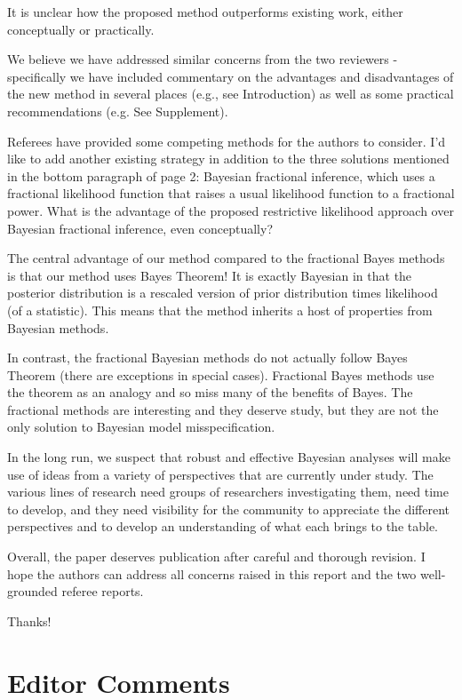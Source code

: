 \documentclass{article}
\newcommand{\response}[1]{{\color{blue}#1}}
\begin{document}
It is unclear how the proposed method outperforms existing work, either conceptually or practically.

\response{We believe we have addressed similar concerns from the two reviewers - specifically we have included commentary on the advantages and disadvantages of the new method in several places (e.g., see Introduction) as well as some practical recommendations (e.g. See Supplement).}

Referees have provided some competing methods for the authors to consider. I'd like to add another existing strategy in addition to the three solutions mentioned in the bottom paragraph of page 2: Bayesian fractional inference, which uses a fractional likelihood function that raises a usual likelihood function to a fractional power. What is the advantage of the proposed restrictive likelihood approach over Bayesian fractional inference, even conceptually?

\response{The central advantage of our method compared to the fractional Bayes methods is that our method uses Bayes Theorem!  It is exactly Bayesian in that the posterior distribution is a rescaled version of prior distribution times likelihood (of a statistic).  This means that the method inherits a host of properties from Bayesian methods.  

In contrast, the fractional Bayesian methods do not actually follow Bayes Theorem (there are exceptions in special cases).  Fractional Bayes methods use the theorem as an analogy and so miss many of the benefits of Bayes.  The fractional methods are interesting and they deserve study, but they are not the only solution to Bayesian model misspecification. 

In the long run, we suspect that robust and effective Bayesian analyses will make use of ideas from a variety of perspectives that are currently under study.  The various lines of research need groups of researchers investigating them, need time to develop, and they need visibility for the community to appreciate the different perspectives and to develop an understanding of what each brings to the table.}

Overall, the paper deserves publication after careful and thorough revision. I hope the authors can address all concerns raised in this report and the two well-grounded referee reports.

\response{ Thanks!}


\section{Editor Comments} 
\end{document}
